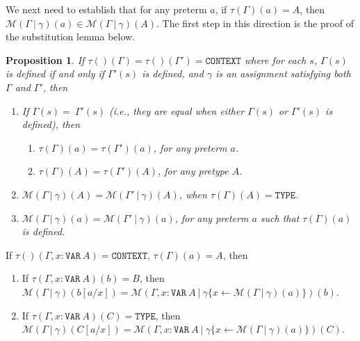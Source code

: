 \documentclass [12pt,twoside]{cslreport}
\newtheorem{prop}[thm]{Proposition}
\newcommand{\tauGamma}[1]{\tau(\Gamma)(#1)}
\newcommand{\Mgamma}[1]{{\mathcal M}(\Gamma\vbar\gamma)(#1)}
\newcommand{\tttype}{\mathtt{TYPE}}
\newcommand{\ttcontext}{\mathtt{CONTEXT}}
\newcommand{\ttvar}{\mathtt{VAR}}
\newcommand{\vbar}{\ |\ }
\begin{document}
We next need to establish that for any preterm $a$,
if $\tauGamma{a} = A$, then $\Mgamma{a}\in \Mgamma{A}$\@.
The first step in this direction is the proof of the substitution lemma
below.
\begin{prop}\label{context-equivalence}
If $\tau()(\Gamma) = \tau()(\Gamma') = \ttcontext$ where
for each $s$, $\Gamma(s)$ is defined if and only if  $\Gamma'(s)$ is defined, and 
$\gamma$ is an assignment satisfying both $\Gamma$ and $\Gamma'$,
then
\begin{enumerate}
\item If  $\Gamma(s) = \ \Gamma'(s)$ (i.e., they are equal when
either $\Gamma(s)$ or $\Gamma'(s)$ is defined), then 
\begin{enumerate}
\item $\tau(\Gamma)(a) = \tau(\Gamma')(a)$, for any preterm $a$.
\item $\tau(\Gamma)(A) = \tau(\Gamma')(A)$, for any pretype $A$.
\end{enumerate}

\item $\Mgamma{A} = \mathcal{M}(\Gamma'\vbar\gamma)(A)$, when $\tauGamma{A} =
\tttype$.

\item $\Mgamma{a} = \mathcal{M}(\Gamma'\vbar\gamma)(a)$, for any preterm $a$
such that $\tauGamma{a}$ is defined.
\end{enumerate}
\end{prop}
%
\begin{lemma}\label{substitution-lemma}
If $\tau()(\Gamma, x:\ttvar~A) = \ttcontext$,
$\tauGamma{a} = A$, then
\begin{enumerate}
\item If $\tau(\Gamma, x: \ttvar~A)(b) = B$, then\\
$\Mgamma{b[a/x]} = \mathcal{M}(\Gamma, x:\ttvar~A\vbar \gamma\{x\gets
\Mgamma{a}\})(b)$.

\item If $\tau(\Gamma, x: \ttvar~A)(C) = \tttype$, then\\
$\Mgamma{C[a/x]} = \mathcal{M}(\Gamma, x:\ttvar~A\vbar \gamma\{x\gets
\Mgamma{a}\})(C)$\@. 
\end{enumerate}
\end{lemma}
\end{document}
